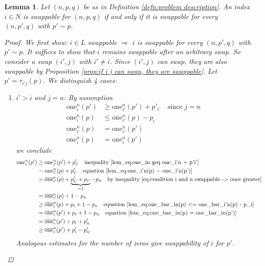 \documentclass[12pt]{article}
\newtheorem{lem}[thm]{Lemma}
\begin{document}
\begin{lem}
Let $(n, p, q)$ be as in Definition \ref{defn:problem description}. An index $i\in N$ is swappable for $(n, p, q)$ if and only if it is swappable for every $(n, p', q)$ with $p'\sim p$.
\begin{proof}
We first show: $i\in L$ swappable $\Rightarrow$ $i$ is swappable for every $(n, p', q)$ with $p'\sim p$. It suffices to show that $i$ remains swappable after an arbitrary swap.
So consider a swap $(i', j)$ with $i'\neq i$.
Since $(i', j)$ can swap, they are also swappable by Proposition \ref{prop:if i j can swap, they are swappable}. Let $p' = \tau_{i'j}(p)$.
We distinguish 4 cases:
\begin{enumerate}

\item
$i'>i$ and $j=n$: By assumption
\begin{align}
\mathrm{one}_{i}^{n}(p')
&\geq
\mathrm{one}_{i'}^{n}(p')
+
p'_{i'}
\quad\textrm{since }j=n
\label{lem_eq:one_in geq one_i'n + p'i'}
\\
\overline{\mathrm{one}}_{i}^{n}(p)
&\leq
\overline{\mathrm{one}}_{i'}^{n}(p)
-
p_{i}
\label{lem_eq:one_bar_in(p) <= one_bar_i'n(p) - p_i}
\\
\mathrm{one}_{i'}^{n}(p)
&=
\mathrm{one}_{i'}^{n}(p')
\label{lem_eq:one_i'n(p) = one_i'n(p')}
\\
\overline{\mathrm{one}}_{i}^{n}(p)
&=
\overline{\mathrm{one}}_{i}^{n}(p')
\label{lem_eq:one_bar_in(p) = one_bar_in(p')}
\end{align}
we conclude
\begin{align*}
\mathrm{one}_{i}^{n}(p')
&\geq
\mathrm{one}_{i'}^{n}(p')
+
p'_{i'}
\quad\textrm{inequality \eqref{lem_eq:one_in geq one_i'n + p'i'}}
\\
&=
\mathrm{one}_{i'}^{n}(p)
+
p'_{i'}
\quad\textrm{equation \eqref{lem_eq:one_i'n(p) = one_i'n(p')}}
\\
&>
\overline{\mathrm{one}}_{i'}^{n}(p)
+
\underbrace{p'_{i'}+p_{i'}}_{=1}-p_n
\quad \textrm{by inequality \eqref{eq:condition i and n swappable -> ones greater}}
\\
&=
\overline{\mathrm{one}}_{i'}^{n}(p)
+
1-p_n
\\
&\geq
\overline{\mathrm{one}}_{i}^{n}(p)
+p_i
+
1-p_n
\quad\textrm{equation \eqref{lem_eq:one_bar_in(p) <= one_bar_i'n(p) - p_i}}
\\
&=
\overline{\mathrm{one}}_{i}^{n}(p')
+p_i
+
1-p_n
\quad\textrm{equation \eqref{lem_eq:one_bar_in(p) = one_bar_in(p')}}
\\
&=
\overline{\mathrm{one}}_{i}^{n}(p')
+p_i
+
p'_n
\\
&\geq
\overline{\mathrm{one}}_i^{n}(p')
+
p'_i-p'_n.
\end{align*}
Analogous estimates for the number of zeros give swappability of $i$ for $p'$.


\end{enumerate}
\end{proof}
\end{lem}
\end{document}
